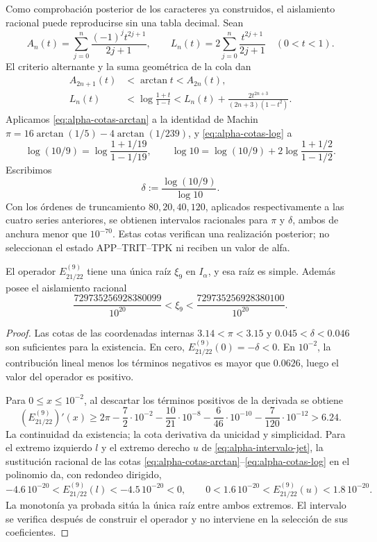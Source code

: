 Como comprobación posterior de los caracteres ya construidos, el
aislamiento racional puede reproducirse sin una tabla decimal. Sean
\[
 A_n(t)=\sum_{j=0}^{n}\frac{(-1)^jt^{2j+1}}{2j+1},\qquad
 L_n(t)=2\sum_{j=0}^{n}\frac{t^{2j+1}}{2j+1}\quad(0<t<1).
\]
El criterio alternante y la suma geométrica de la cola dan
\begin{align}
 A_{2n+1}(t)&<\arctan t<A_{2n}(t),
 \label{eq:alpha-cotas-arctan}\\
 L_n(t)&<\log\frac{1+t}{1-t}
 <L_n(t)+\frac{2t^{2n+3}}{(2n+3)(1-t^2)}.
 \label{eq:alpha-cotas-log}
\end{align}
Aplicamos \eqref{eq:alpha-cotas-arctan} a la identidad de Machin
\(\pi=16\arctan(1/5)-4\arctan(1/239)\), y
\eqref{eq:alpha-cotas-log} a
\[
 \log(10/9)=\log\frac{1+1/19}{1-1/19},\qquad
 \log 10=\log(10/9)+2\log\frac{1+1/2}{1-1/2}.
\]
Escribimos
\[
 \delta:=\frac{\log(10/9)}{\log 10}.
\]
Con los órdenes de truncamiento \(80,20,40,120\), aplicados
respectivamente a las cuatro series anteriores, se obtienen intervalos
racionales para \(\pi\) y \(\delta\), ambos de anchura menor que
\(10^{-70}\). Estas cotas verifican una realización posterior; no
seleccionan el estado APP--TRIT--TPK ni reciben un valor de alfa.

\begin{proposition}
\label{prop:alpha-raiz-jet}
El operador \(E_{21/22}^{(9)}\) tiene una única raíz
\(\xi_9\) en \(I_\alpha\), y esa raíz es simple. Además posee el aislamiento racional
\begin{equation}
 \frac{729735256928380099}{10^{20}}
 <\xi_9<\frac{729735256928380100}{10^{20}}.
 \label{eq:alpha-intervalo-jet}
\end{equation}
\end{proposition}

\begin{proof}
Las cotas de las coordenadas internas
\(3.14<\pi<3.15\) y
\(0.045<\delta<0.046\) son suficientes para la existencia. En cero,
\(E_{21/22}^{(9)}(0)=-\delta<0\). En \(10^{-2}\), la contribución
lineal menos los términos negativos es mayor que \(0.0626\), luego el
valor del operador es positivo.

Para \(0\leq x\leq10^{-2}\), al descartar los términos positivos de
la derivada se obtiene
\[
 (E_{21/22}^{(9)})'(x)
 \geq2\pi-\frac72\cdot10^{-2}
 -\frac{10}{21}\cdot10^{-8}-\frac6{46}\cdot10^{-10}
 -\frac7{120}\cdot10^{-12}>6.24.
\]
La continuidad da existencia; la cota derivativa da unicidad y
simplicidad. Para el extremo izquierdo \(l\) y el extremo derecho \(u\)
de \eqref{eq:alpha-intervalo-jet}, la sustitución racional de las cotas
\eqref{eq:alpha-cotas-arctan}--\eqref{eq:alpha-cotas-log} en el polinomio
da, con redondeo dirigido,
\[
 -4.6\,10^{-20}<E_{21/22}^{(9)}(l)<-4.5\,10^{-20}<0,
 \qquad
 0<1.6\,10^{-20}<E_{21/22}^{(9)}(u)<1.8\,10^{-20}.
\]
La monotonía ya probada sitúa la única raíz entre ambos extremos.
El intervalo se verifica después de construir el operador y no
interviene en la selección de sus coeficientes.
\end{proof}

